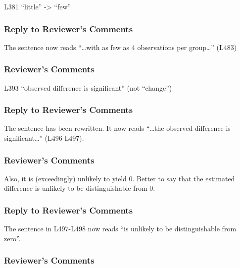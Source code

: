 \documentclass[
]{article}
\begin{document}
L381 ``little'' -\textgreater{} ``few''

\hypertarget{section-34}{%
\subsubsection{\texorpdfstring{\textcolor{reviewersblue} {Reply to Reviewer's Comments}}{}}\label{section-34}}

The sentence now reads ``\ldots with as few as 4 observations per group\ldots{}'' (L483)

\hypertarget{reviewers-comments-34}{%
\subsubsection{Reviewer's Comments}\label{reviewers-comments-34}}

L393 ``observed difference is significant'' (not ``change'')

\hypertarget{section-35}{%
\subsubsection{\texorpdfstring{\textcolor{reviewersblue} {Reply to Reviewer's Comments}}{}}\label{section-35}}

The sentence has been rewritten. It now reads ``\ldots the observed difference is significant\ldots{}'' (L496-L497).

\hypertarget{reviewers-comments-35}{%
\subsubsection{Reviewer's Comments}\label{reviewers-comments-35}}

Also, it is (exceedingly) unlikely to yield 0. Better to say that the estimated difference is unlikely to be distinguishable from 0.

\hypertarget{section-36}{%
\subsubsection{\texorpdfstring{\textcolor{reviewersblue} {Reply to Reviewer's Comments}}{}}\label{section-36}}

The sentence in L497-L498 now reads ``is unlikely to be distinguishable from zero''.

\hypertarget{reviewers-comments-36}{%
\subsubsection{Reviewer's Comments}\label{reviewers-comments-36}}
\end{document}
